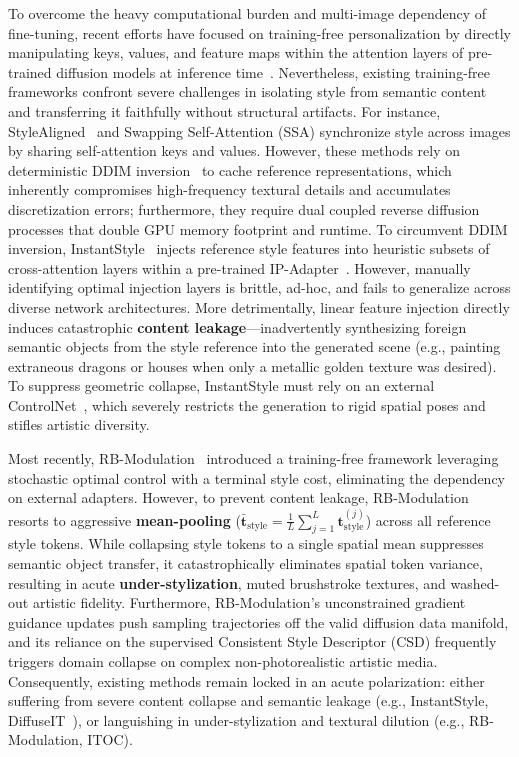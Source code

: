To overcome the heavy computational burden and multi-image dependency of fine-tuning, recent efforts have focused on training-free personalization by directly manipulating keys, values, and feature maps within the attention layers of pre-trained diffusion models at inference time~\cite{stylealigned,instantstyle,styleid,diffstyler,freestyle}. Nevertheless, existing training-free frameworks confront severe challenges in isolating style from semantic content and transferring it faithfully without structural artifacts. For instance, StyleAligned~\cite{stylealigned} and Swapping Self-Attention (SSA) synchronize style across images by sharing self-attention keys and values. However, these methods rely on deterministic DDIM inversion~\cite{DDIM} to cache reference representations, which inherently compromises high-frequency textural details and accumulates discretization errors; furthermore, they require dual coupled reverse diffusion processes that double GPU memory footprint and runtime. To circumvent DDIM inversion, InstantStyle~\cite{instantstyle} injects reference style features into heuristic subsets of cross-attention layers within a pre-trained IP-Adapter~\cite{ipadapter}. However, manually identifying optimal injection layers is brittle, ad-hoc, and fails to generalize across diverse network architectures. More detrimentally, linear feature injection directly induces catastrophic \textbf{content leakage}---inadvertently synthesizing foreign semantic objects from the style reference into the generated scene (e.g., painting extraneous dragons or houses when only a metallic golden texture was desired). To suppress geometric collapse, InstantStyle must rely on an external ControlNet~\cite{controlNet}, which severely restricts the generation to rigid spatial poses and stifles artistic diversity.

Most recently, RB-Modulation~\cite{rout2025rbmodulation} introduced a training-free framework leveraging stochastic optimal control with a terminal style cost, eliminating the dependency on external adapters. However, to prevent content leakage, RB-Modulation resorts to aggressive \textbf{mean-pooling} ($\bar{\mathbf{t}}_{\text{style}} = \frac{1}{L} \sum_{j=1}^L \mathbf{t}_{\text{style}}^{(j)}$) across all reference style tokens. While collapsing style tokens to a single spatial mean suppresses semantic object transfer, it catastrophically eliminates spatial token variance, resulting in acute \textbf{under-stylization}, muted brushstroke textures, and washed-out artistic fidelity. Furthermore, RB-Modulation's unconstrained gradient guidance updates push sampling trajectories off the valid diffusion data manifold, and its reliance on the supervised Consistent Style Descriptor (CSD) frequently triggers domain collapse on complex non-photorealistic artistic media. Consequently, existing methods remain locked in an acute polarization: either suffering from severe content collapse and semantic leakage (e.g., InstantStyle, DiffuseIT~\cite{diffuseIT}), or languishing in under-stylization and textural dilution (e.g., RB-Modulation, ITOC).

